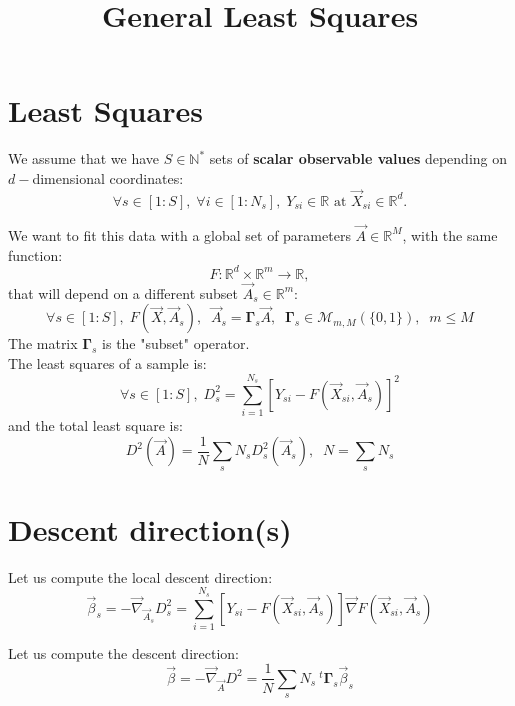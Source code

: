 \documentclass[aps,12pt]{revtex4}
\newcommand{\trn}[1]{~^t{#1}}
\begin{document}
\title{General Least Squares}
\maketitle

\section{Least Squares}
We assume that we have $S\in \mathbb{N}^*$ sets of \textbf{scalar observable values} depending on $d-$dimensional coordinates:
\begin{equation}
	\forall s \in [1:S], \; \forall i \in [1:N_s], \; Y_{si} \in \mathbb{R} \text{ at } \vec{X}_{si} \in \mathbb{R}^d.
\end{equation}

We want to fit this data with a global set of parameters $\vec{A}\in \mathbb{R}^M$,
with the same function: 
\begin{equation}
F : \mathbb{R}^d \times \mathbb{R}^m \rightarrow \mathbb{R},
\end{equation}
that will depend on a different subset $\vec{A}_s\in\mathbb{R}^m$:
\begin{equation}
	\forall s \in [1:S], \; F(\vec{X},\vec{A}_s), \;\; \vec{A}_s = \bm{\Gamma}_s \vec{A}, \;\; \bm{\Gamma}_s \in \mathcal{M}_{m,M}(\{0,1\}),\;\;m\leq M
\end{equation}
The matrix $\bm{\Gamma}_s$ is the "subset" operator.\\
The least squares of a sample is:
\begin{equation}
		\forall s \in [1:S], \; D^2_s = \sum_{i=1}^{N_s} \left[ Y_{si} - F(\vec{X}_{si},\vec{A}_s) \right]^2
\end{equation}
and the total least square is:
\begin{equation}
	D^2(\vec{A}) = \frac{1}{N}\sum_s N_s D^2_s (\vec{A}_s ),\;\; N=\sum_s N_s
\end{equation}

\section{Descent direction(s)}
Let us compute the local descent direction:
\begin{equation}
	\vec{\beta}_s = - \vec{\nabla}_{\vec{A}_s} D^2_s =  \sum_{i=1}^{N_s} \left[ Y_{si} - F(\vec{X}_{si},\vec{A}_s) \right] \vec{\nabla} F(\vec{X}_{si},\vec{A}_s)
\end{equation}

Let us compute the descent direction:
\begin{equation}
 	\vec{\beta}    = - \vec{\nabla}_{\vec{A}} D^2 
	 =  \dfrac{1}{N} \sum_s N_s \trn{\bm{\Gamma}}_s \vec{\beta}_s
\end{equation}
\end{document}
